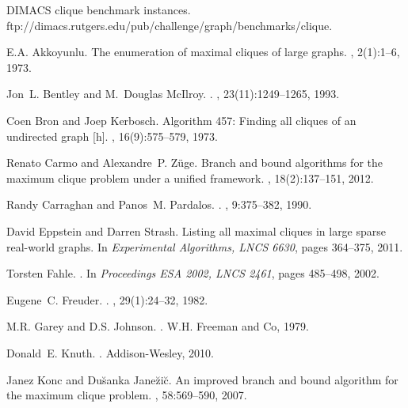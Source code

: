 \documentclass{l4proj}
\begin{document}

%
\begin{thebibliography}{10}

{DIMACS clique benchmark instances}.
\newblock ftp://dimacs.rutgers.edu/pub/challenge/graph/benchmarks/clique.

E.A. Akkoyunlu.
\newblock The enumeration of maximal cliques of large graphs.
, 2(1):1--6, 1973.

Jon~L. Bentley and M.~Douglas McIlroy.
.
, 23(11):1249--1265, 1993.

Coen Bron and Joep Kerbosch.
\newblock Algorithm 457: Finding all cliques of an undirected graph [h].
, 16(9):575--579, 1973.

Renato Carmo and Alexandre~P. Z{\"u}ge.
\newblock Branch and bound algorithms for the maximum clique problem under a
  unified framework.
, 18(2):137--151, 2012.

Randy Carraghan and Panos~M. Pardalos.
.
, 9:375--382, 1990.

David Eppstein and Darren Strash.
\newblock Listing all maximal cliques in large sparse real-world graphs.
\newblock In {\em Experimental Algorithms, LNCS 6630}, pages 364--375, 2011.

Torsten Fahle.
.
\newblock In {\em Proceedings {ESA 2002}, LNCS 2461}, pages 485--498, 2002.

Eugene~C. Freuder.
.
,
  29(1):24--32, 1982.

M.R. Garey and D.S. Johnson.
.
\newblock W.H. Freeman and Co, 1979.

Donald~E. Knuth.
.
\newblock Addison-Wesley, 2010.

Janez Konc and Du\u{s}anka Jane\u{z}i\u{c}.
\newblock An improved branch and bound algorithm for the maximum clique
  problem.
,
  58:569--590, 2007.


\end{thebibliography}
\end{document}
